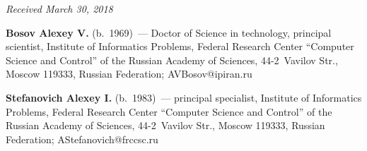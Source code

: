 \begin{multicols}{2}
{{ }
 }

\end{multicols}

\vspace*{-6pt}

\hfill{\small\textit{Received March 30, 2018}}


     
     \Contr
     
       \noindent
       \textbf{Bosov Alexey V.} (b.\ 1969)~--- Doctor of Science in technology, 
principal scientist, Institute of Informatics Problems, Federal Research 
Center ``Computer Science and Control'' of the Russian Academy of Sciences, 
44-2~Vavilov Str., Moscow 119333, Russian Federation; 
\mbox{AVBosov@ipiran.ru}
       
       \vspace*{3pt}
       
       \noindent
       \textbf{Stefanovich Alexey I.} (b.\ 1983)~--- principal specialist, 
Institute of Informatics Problems, Federal Research Center ``Computer Science 
and Control'' of the Russian Academy of Sciences, 44-2~Vavilov Str., Moscow 
119333, Russian Federation; \mbox{AStefanovich@frccsc.ru}
\label{end\stat}

\renewcommand{\bibname}{\protect\rm Литература}       

      